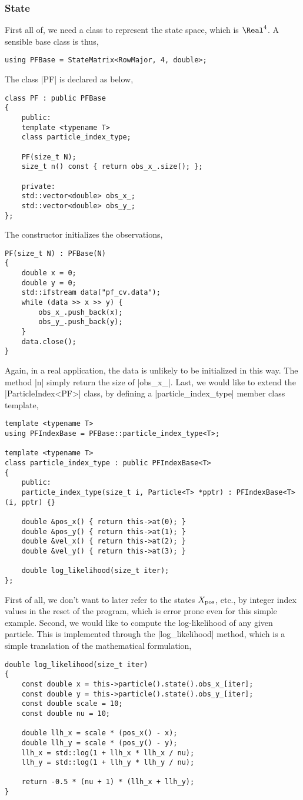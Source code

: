 \subsubsection{State}

First all of, we need a class to represent the state space, which is $\Real^4$.
A sensible base class is thus,
\begin{verbatim}
using PFBase = StateMatrix<RowMajor, 4, double>;
\end{verbatim}
The class |PF| is declared as below,
\begin{verbatim}
class PF : public PFBase
{
    public:
    template <typename T>
    class particle_index_type;

    PF(size_t N);
    size_t n() const { return obs_x_.size(); };

    private:
    std::vector<double> obs_x_;
    std::vector<double> obs_y_;
};
\end{verbatim}
The constructor initializes the observations,
\begin{verbatim}
PF(size_t N) : PFBase(N)
{
    double x = 0;
    double y = 0;
    std::ifstream data("pf_cv.data");
    while (data >> x >> y) {
        obs_x_.push_back(x);
        obs_y_.push_back(y);
    }
    data.close();
}
\end{verbatim}
Again, in a real application, the data is unlikely to be initialized in this
way. The method |n| simply return the size of |obs_x_|. Last, we would like to
extend the |ParticleIndex<PF>| class, by defining a |particle_index_type|
member class template,
\begin{verbatim}
template <typename T>
using PFIndexBase = PFBase::particle_index_type<T>;

template <typename T>
class particle_index_type : public PFIndexBase<T>
{
    public:
    particle_index_type(size_t i, Particle<T> *pptr) : PFIndexBase<T>(i, pptr) {}

    double &pos_x() { return this->at(0); }
    double &pos_y() { return this->at(1); }
    double &vel_x() { return this->at(2); }
    double &vel_y() { return this->at(3); }

    double log_likelihood(size_t iter);
};
\end{verbatim}
First of all, we don't want to later refer to the states $X_{\mathrm{pos}}$, etc., by
integer index values in the reset of the program, which is error prone even for
this simple example. Second, we would like to compute the log-likelihood of any
given particle. This is implemented through the |log_likelihood| method, which
is a simple translation of the mathematical formulation,
\begin{verbatim}
double log_likelihood(size_t iter)
{
    const double x = this->particle().state().obs_x_[iter];
    const double y = this->particle().state().obs_y_[iter];
    const double scale = 10;
    const double nu = 10;

    double llh_x = scale * (pos_x() - x);
    double llh_y = scale * (pos_y() - y);
    llh_x = std::log(1 + llh_x * llh_x / nu);
    llh_y = std::log(1 + llh_y * llh_y / nu);

    return -0.5 * (nu + 1) * (llh_x + llh_y);
}
\end{verbatim}

